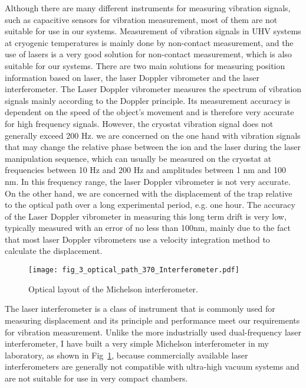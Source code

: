 Although there are many different instruments for measuring vibration signals, such as capacitive sensors for vibration measurement, most of them are not suitable for use in our systems. Measurement of vibration signals in UHV systems at cryogenic temperatures is mainly done by non-contact measurement, and the use of lasers is a very good solution for non-contact measurement, which is also suitable for our systems. There are two main solutions for measuring position information based on laser, the laser Doppler vibrometer and the laser interferometer. The Laser Doppler vibrometer measures the spectrum of vibration signals mainly according to the Doppler principle. Its measurement accuracy is dependent on the speed of the object's movement and is therefore very accurate for high frequency signals. However, the cryostat vibration signal does not generally exceed 200 Hz. we are concerned on the one hand with vibration signals that may change the relative phase between the ion and the laser during the laser manipulation sequence, which can usually be measured on the cryostat at frequencies between 10 Hz and 200 Hz and amplitudes between 1 nm and 100 nm. In this frequency range, the laser Doppler vibrometer is not very accurate. On the other hand, we are concerned with the displacement of the trap relative to the optical path over a long experimental period, e.g. one hour. The accuracy of the Laser Doppler vibrometer in measuring this long term drift is very low, typically measured with an error of no less than 100nm, mainly due to the fact that most laser Doppler vibrometers use a velocity integration method to calculate the displacement.

\begin{figure}
    \centering
    \texttt{[image: fig\_3\_optical\_path\_370\_Interferometer.pdf]}
    \caption{Optical layout of the Michelson interferometer.}
    \label{fig:fig_3_optical_path_370_Interferometer}
\end{figure}

The laser interferometer is a class of instrument that is commonly used for measuring displacement and its principle and performance meet our requirements for vibration measurement. Unlike the more industrially used dual-frequency laser interferometer, I have built a very simple Michelson interferometer in my laboratory, as shown in Fig~\ref{fig:fig_3_optical_path_370_Interferometer}, because commercially available laser interferometers are generally not compatible with ultra-high vacuum systems and are not suitable for use in very compact chambers.

